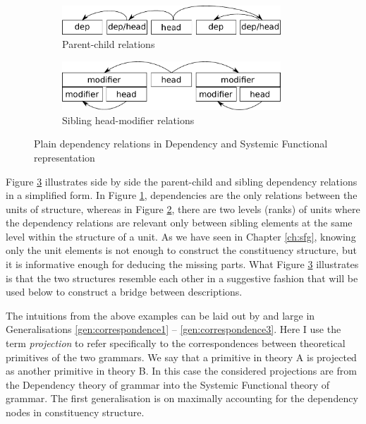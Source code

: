     \begin{figure}[!ht]
        \centering
        \begin{subfigure}{.5\textwidth}
            \centering
            \includegraphics[width=0.9\textwidth]{Figures/SFL-grammar/dependency-dg.pdf}
            \vspace{+22pt}
            \caption{Parent-child relations}
            \label{fig:dependency-dg}
        \end{subfigure}%
        \begin{subfigure}{.5\textwidth}
            \centering
            \includegraphics[width=0.9\textwidth]{Figures/SFL-grammar/dependency-sfg.pdf}
            \caption{Sibling head-modifier relations}
            \label{fig:dependency-sfg}
        \end{subfigure}
        \caption{Plain dependency relations in Dependency and Systemic Functional representation}
        \label{fig:dependency-relations}
    \end{figure}

    Figure \ref{fig:dependency-relations} illustrates side by side the parent-child and sibling dependency relations in a simplified form. In Figure \ref{fig:dependency-dg}, dependencies are the only relations between the units of structure, whereas in Figure \ref{fig:dependency-sfg}, there are two levels (ranks) of units where the dependency relations are relevant only between sibling elements at the same level within the structure of a unit. As we have seen in Chapter \ref{ch:sfg}, knowing only the unit elements is not enough to construct the constituency structure, but it is informative enough for deducing the missing parts. What Figure \ref{fig:dependency-relations} illustrates is that the two structures resemble each other in a suggestive fashion that will be used below to construct a bridge between descriptions.  


    The intuitions from the above examples can be laid out by and large in Generalisations \ref{gen:correspondence1} -- \ref{gen:correspondence3}. Here I use the term \textit{projection} to refer specifically to the correspondences between theoretical primitives of the two grammars. We say that a primitive in theory A is projected as another primitive in theory B. In this case the considered projections are from the Dependency theory of grammar into the Systemic Functional theory of grammar. The first generalisation is on maximally accounting for the dependency nodes in constituency structure.

